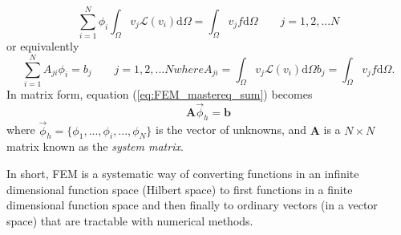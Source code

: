 \begin{equation}
    \sum_{i=1}^N\phi_i \int_\Omega v_j \mathcal{L} (v_i) \text{d}\Omega = \int_\Omega v_j f \text{d}\Omega \quad\quad j=1,2,...N
    \label{eq:FEM_mastereq_integral}
\end{equation}
or equivalently\cite{FEM_TheoryAndCompOfEM_Jian-Ming_Jin}
\begin{subequations}
\begin{equation}
    \sum_{i=1}^N A_{ji}\phi_i = b_j \quad\quad j=1,2,...N
\end{equation}
where
\begin{equation}
    A_{ji} = \int_\Omega v_j \mathcal{L}(v_i)\text{d}\Omega
    \label{eq:FEM_mastereq_sum_Aji_bj}    
\end{equation}
\begin{equation}
    b_j = \int_\Omega v_j f \text{d}\Omega.
\end{equation}
\label{eq:FEM_mastereq_sum}
\end{subequations} %
In matrix form, equation (\ref{eq:FEM_mastereq_sum}) becomes
\begin{equation}
    \mathbf{A}\vec{\phi}_h = \mathbf{b}
    \label{eq:FEM_mastereq_matrix}
\end{equation}
where $\vec{\phi}_h = \{\phi_1, ...,\phi_i, ..., \phi_N\}$ is the vector of unknowns, and $\mathbf{A}$ is a $N\times N$ matrix known as the \emph{system matrix}\cite{FEM_comsol}. 

In short, FEM is a systematic way of converting functions in an infinite dimensional function space (Hilbert space) to first functions in a finite dimensional function space and then finally to ordinary vectors (in a vector space) that are tractable with numerical methods.


